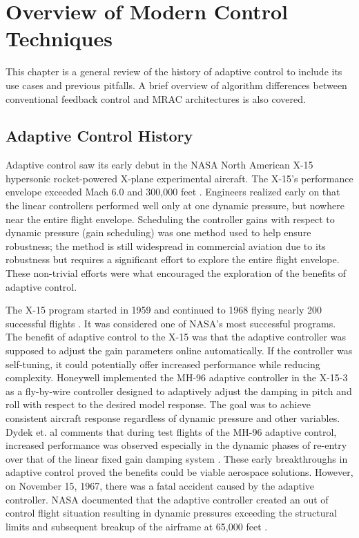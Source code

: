 \chapter{Overview of Modern Control Techniques}\label{ch:overview}
This chapter is a general review of the history of adaptive control to include its use cases and previous pitfalls.  A brief overview of algorithm differences between conventional feedback control and \ac{MRAC} architectures is also covered.
\section{Adaptive Control History}\label{history}
Adaptive control saw its early debut in the NASA North American X-15 hypersonic rocket-powered X-plane experimental aircraft.  The X-15's performance envelope exceeded Mach 6.0 and 300,000 feet \cite{jenkins2000x15specs}.  Engineers realized early on that the linear controllers performed well only at one dynamic pressure, but nowhere near the entire flight envelope.  Scheduling the controller gains with respect to dynamic pressure (gain scheduling) was one method used to help ensure robustness;  the method is still widespread in commercial aviation due to its robustness but requires a significant effort to explore the entire flight envelope.  These non-trivial efforts were what encouraged the exploration of the benefits of adaptive control.

The X-15 program started in 1959 and continued to 1968 flying nearly 200 successful flights \cite{nasa_x15_facts}.  It was considered one of NASA's most successful programs.  The benefit of adaptive control to the X-15 was that the adaptive controller was supposed to adjust the gain parameters online automatically.  If the controller was self-tuning, it could potentially offer increased performance while reducing complexity.  Honeywell implemented the MH-96 adaptive controller in the X-15-3 as a fly-by-wire controller designed to adaptively adjust the damping in pitch and roll with respect to the desired model response.  The goal was to achieve consistent aircraft response regardless of dynamic pressure and other variables.  Dydek et. al comments that during test flights of the MH-96 adaptive control, increased performance was observed especially in the dynamic phases of re-entry over that of the linear fixed gain damping system \cite{dydek2010adaptive}.  These early breakthroughs in adaptive control proved the benefits could be viable aerospace solutions.  However, on November 15, 1967, there was a fatal accident caused by the adaptive controller.  NASA documented that the adaptive controller created an out of control flight situation resulting in dynamic pressures exceeding the structural limits and subsequent breakup of the airframe at 65,000 feet \cite{nasa_x15_facts}.

